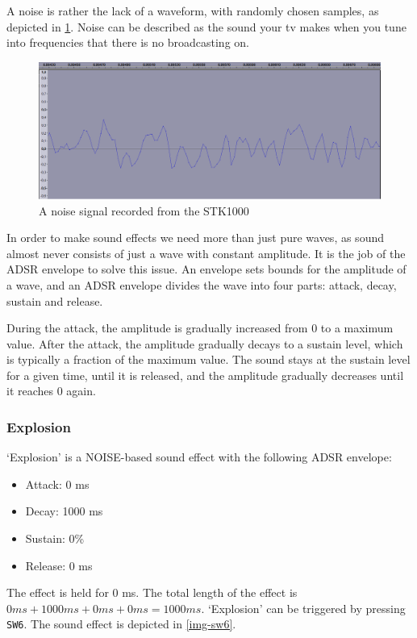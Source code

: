 A noise is rather the lack of a waveform, with randomly chosen samples, as depicted in \ref{img-sw6zoom}.
Noise can be described as the sound your tv makes when you tune into frequencies that there is no broadcasting on.
\begin{figure}[H]
	\includegraphics[width = \textwidth]{images/SW6zoom.png}
	\caption{A noise signal recorded from the STK1000}
	\label{img-sw6zoom}
\end{figure}

In order to make sound effects we need more than just pure waves, as sound almost never consists of just a wave with constant amplitude.
It is the job of the ADSR envelope to solve this issue.
An envelope sets bounds for the amplitude of a wave, and an ADSR envelope divides the wave into four parts: attack, decay, sustain and release.

During the attack, the amplitude is gradually increased from 0 to a maximum value.
After the attack, the amplitude gradually decays to a sustain level, which is typically a fraction of the maximum value.
The sound stays at the sustain level for a given time, until it is released, and the amplitude gradually decreases until it reaches 0 again.

\subsubsection{Explosion}

`Explosion' is a NOISE-based sound effect with the following ADSR envelope:
\begin{itemize}
	\item{Attack: 0 ms}
	\item{Decay: 1000 ms}
	\item{Sustain: 0\%}
	\item{Release: 0 ms}
\end{itemize}
The effect is held for 0 ms.
The total length of the effect is $0 ms + 1000 ms + 0 ms + 0 ms = 1000 ms$.
`Explosion' can be triggered by pressing \texttt{SW6}.
The sound effect is depicted in \ref{img-sw6}.

